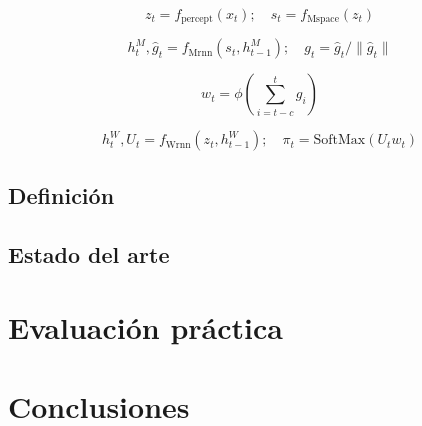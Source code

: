 \documentclass[letterpaper]{article} %
\begin{document}
\begin{equation}
z_t = f_{\text{percept}}(x_t);\quad s_t = f_{\text{Mspace}}(z_t)
\label{eq:1}
\end{equation}

\begin{equation}
h_t^M, \hat{g}_t = f_{\text{Mrnn}}(s_t, h_{t-1}^M);\quad g_t = \hat{g}_t / \|\hat{g}_t\|
\label{eq:2}
\end{equation}

\begin{equation}
w_t = \phi\left(\sum_{i=t-c}^t g_i\right)
\label{eq:3}
\end{equation}

\begin{equation}
h_t^W, U_t = f_{\text{Wrnn}}(z_t, h_{t-1}^W);\quad \pi_t = \text{SoftMax}(U_t w_t)
\label{eq:4}
\end{equation}

\subsection{Definición}

\subsection{Estado del arte}

\section{Evaluación práctica}

\section{Conclusiones}






\end{document}
